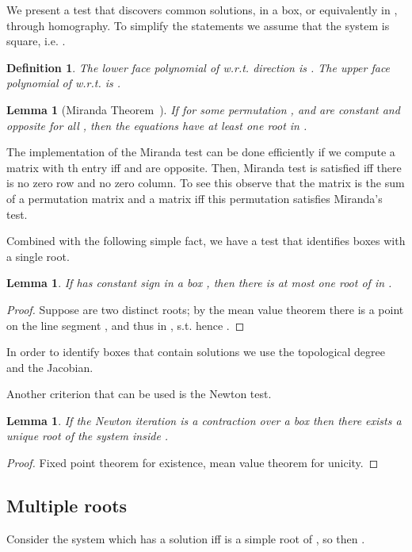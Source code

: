 \documentclass{sig-alternate}
\newtheorem{lemma}[theorem]{Lemma}
\newtheorem{definition}[theorem]{Definition}\newtheorem{dxample}[theorem]{Example}
\begin{document}
We present a test that discovers common solutions, in a box, or
equivalently in , through homography. To simplify the
statements we assume that the system is square, i.e. .

\begin{definition}
  The \emph{lower face} polynomial of  w.r.t. direction  is
  . The \emph{upper face} polynomial of 
  w.r.t.  is .
\end{definition}



\begin{lemma}[Miranda Theorem~\cite{vrahatis1989}]
  If for some permutation ,
   and  are constant and opposite for all , then
  the equations  have at least one root in .
\end{lemma}

The implementation of the Miranda test can be done efficiently if we
compute a  matrix with th entry  iff  and  are opposite. Then,
Miranda test is satisfied iff there is no zero row and no zero
column. To see this observe that the matrix is the sum of a
permutation matrix and a  matrix iff this permutation satisfies
Miranda's test.

Combined with the following simple fact, we have a test that
identifies boxes with a single root.
\begin{lemma} 
  If  has constant sign in a box , then there
  is at most one root of  in .
\end{lemma} 
\begin{proof}
  Suppose  are two distinct roots; by the mean value theorem
  there is a point  on the line segment , and thus
  in , s.t.  hence .
\end{proof}


In order to identify boxes that contain solutions we use the topological degree and the Jacobian.

Another criterion that can be used is the Newton test.
\begin{lemma}
If the Newton iteration is a contraction over a box  then there exists a unique root of the system inside .
\end{lemma}
\begin {proof}
Fixed point theorem for existence, mean value theorem for unicity.
\end{proof}

\subsection{Multiple roots}
Consider the system
 which has a solution  iff  is a simple
root of , so then .
\end{document}
